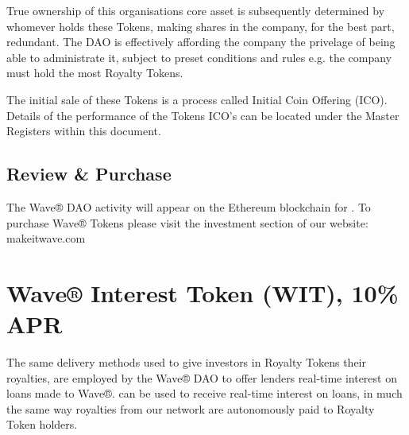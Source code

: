 \documentclass[letterpaper,10pt,english]{sphinxmanual}
\begin{document}
True ownership of this organisations core asset is subsequently determined by whomever holds these Tokens, making shares in the company, for the best part, redundant.
The DAO is effectively affording the company the privelage of being able to administrate it, subject to preset conditions and rules e.g. the company must hold the most Royalty Tokens.

The initial sale of these Tokens is a process called Initial Coin Offering (ICO).
Details of the performance of the Tokens ICO’s can be located under the Master Registers within this document.


\section{Review \& Purchase}
\label{\detokenize{introduction:review-purchase}}
The Wave® DAO activity will appear on the Ethereum blockchain for .
To purchase Wave® Tokens please visit the investment section of our website: makeitwave.com


\chapter{Wave® Interest Token (WIT), 10\% APR}
\label{\detokenize{wit-detail:wave-interest-token-wit-10-apr}}\label{\detokenize{wit-detail::doc}}
The same delivery methods used to give investors in Royalty Tokens their royalties, are employed by the Wave® DAO to offer lenders real-time interest on loans made to Wave®.
 can be used to receive real-time interest on loans, in much the same way royalties from our network are autonomously paid to Royalty Token holders.
\end{document}
